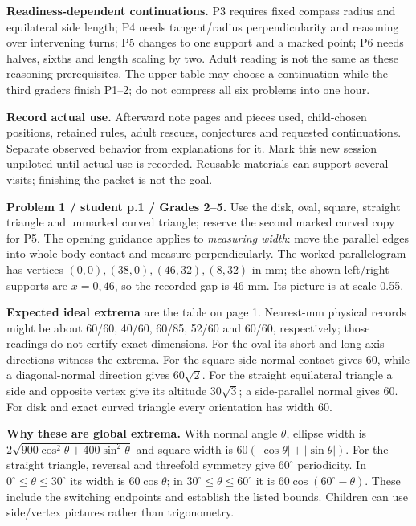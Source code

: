 \documentclass[11pt,letterpaper]{article}
\newcommand{\heading}[1]{\par\vspace{2pt}{\large\bfseries #1}\par}
\newcommand{\lead}[1]{\textbf{#1}}
\begin{document}
\lead{Readiness-dependent continuations.} P3 requires fixed compass radius and equilateral side length; P4 needs tangent/radius perpendicularity and reasoning over intervening turns; P5 changes to one support and a marked point; P6 needs halves, sixths and length scaling by two. Adult reading is not the same as these reasoning prerequisites. The upper table may choose a continuation while the third graders finish P1--2; do not compress all six problems into one hour.

\lead{Record actual use.} Afterward note pages and pieces used, child-chosen positions, retained rules, adult rescues, conjectures and requested continuations. Separate observed behavior from explanations for it. Mark this new session unpiloted until actual use is recorded. Reusable materials can support several visits; finishing the packet is not the goal.

\newpage
\heading{Solutions and adult prompts: Problems 1--2}
\lead{Problem 1 / student p.1 / Grades 2--5.} Use the disk, oval, square, straight triangle and unmarked curved triangle; reserve the second marked curved copy for P5. The opening guidance applies to \emph{measuring width}: move the parallel edges into whole-body contact and measure perpendicularly. The worked parallelogram has vertices $(0,0),(38,0),(46,32),(8,32)$ in mm; the shown left/right supports are $x=0,46$, so the recorded gap is 46 mm. Its picture is at scale 0.55.

\lead{Expected ideal extrema} are the table on page 1. Nearest-mm physical records might be about 60/60, 40/60, 60/85, 52/60 and 60/60, respectively; those readings do not certify exact dimensions. For the oval its short and long axis directions witness the extrema. For the square side-normal contact gives 60, while a diagonal-normal direction gives $60\sqrt2$. For the straight equilateral triangle a side and opposite vertex give its altitude $30\sqrt3$; a side-parallel normal gives 60. For disk and exact curved triangle every orientation has width 60.

\lead{Why these are global extrema.} With normal angle $\theta$, ellipse width is $2\sqrt{900\cos^2\theta+400\sin^2\theta}$ and square width is $60(|\cos\theta|+|\sin\theta|)$. For the straight triangle, reversal and threefold symmetry give $60^\circ$ periodicity. In $0^\circ\le\theta\le30^\circ$ its width is $60\cos\theta$; in $30^\circ\le\theta\le60^\circ$ it is $60\cos(60^\circ-\theta)$. These include the switching endpoints and establish the listed bounds. Children can use side/vertex pictures rather than trigonometry.
\end{document}
